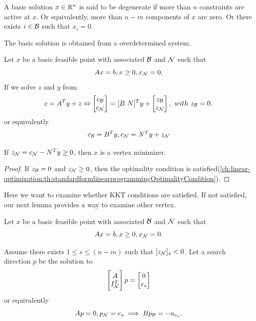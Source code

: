 \begin{refsection}
\begin{definition}[degeneracy]
	A basic solution $x\in \mathbb{R}^n$ is said to be degenerate if more than $n$ constraints are active at $x$. Or equivalently, more than $n-m$ components of $x$ are zero. Or there exists $i\in \mathcal{B}$ such that $x_i = 0$.
\end{definition}

\begin{remark}
	The basic solution is obtained from a overdetermined system.
\end{remark}



\begin{lemma}
Let $x$ be a basic feasible point with associated $\mathcal{B}$ and $\mathcal{N}$ such that
$$Ax = b, x\geq 0, x_{\mathcal{N}} = 0.$$
If we solve $z$ and $y$ from 
$$c = A^Ty + z \Leftrightarrow 
\begin{bmatrix}
c_{\mathcal{B}}\\
c_{\mathcal{N}}
\end{bmatrix} = [B ~ N]^Ty + \begin{bmatrix}
z_{\mathcal{B}}\\
z_{\mathcal{N}}
\end{bmatrix}
,~with~ z_{\mathcal{B}} = 0.$$ 
or equivalently
$$c_{\mathcal{B}} = B^Ty, c_{\mathcal{N}} = N^Ty + z_{\mathcal{N}}$$

If $z_{\mathcal{N}} = c_{\mathcal{N}}  - N^Ty \geq 0$, then $x$ is a vertex minimizer. 
\end{lemma}
\begin{proof}
If $z_{\mathcal{B}} = 0$ and $z_{\mathcal{N}} \geq 0$, then the optimality condition is satisfied(\autoref{ch:linear-optimization:th:standardformlinearprogrammingOptimalityCondition}). 
\end{proof}

\begin{remark}[interpretation]
Here we want to examine whether KKT conditions are satisfied. If not satisfied, our next lemma provides a way to examine other vertex. 
\end{remark}


\begin{lemma}\label{ch:linear-optimization:th:revisedSimplexAlgorithmSearchDirectionProperty}
Let $x$ be a basic feasible point with associated $\mathcal{B}$ and $\mathcal{N}$ such that 
$$Ax = b, x\geq 0, x_{\mathcal{N}} = 0.$$

Assume there exists $1\leq s \leq (n-m)$ such that $[z_{\mathcal{N}}]_s < 0$.
Let a search direction $p$ be the solution to 
$$\begin{bmatrix}
A\\
I^T_{\mathcal{N}}
\end{bmatrix} p = \begin{bmatrix}
0\\
e_s
\end{bmatrix}$$
or equivalently
$$Ap = 0, p_{\mathcal{N}} = e_s \implies Bp_{\mathcal{B}} = -a_{v_s}.$$


\end{lemma}
\end{refsection}
